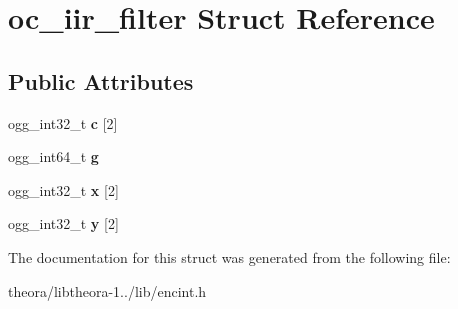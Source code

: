 \hypertarget{structoc__iir__filter}{\section{oc\+\_\+iir\+\_\+filter Struct Reference}
\label{structoc__iir__filter}
}
\subsection*{Public Attributes}
\begin{DoxyCompactItemize}
\item 
\hypertarget{structoc__iir__filter_a904a4532156c83b4cdf0576926f898a8}{ogg\+\_\+int32\+\_\+t {\bfseries c} \mbox{[}2\mbox{]}}\label{structoc__iir__filter_a904a4532156c83b4cdf0576926f898a8}

\item 
\hypertarget{structoc__iir__filter_adbd360cadc6c7bcb08a2b274be736770}{ogg\+\_\+int64\+\_\+t {\bfseries g}}\label{structoc__iir__filter_adbd360cadc6c7bcb08a2b274be736770}

\item 
\hypertarget{structoc__iir__filter_a18d61f660f95452382b01837226159a9}{ogg\+\_\+int32\+\_\+t {\bfseries x} \mbox{[}2\mbox{]}}\label{structoc__iir__filter_a18d61f660f95452382b01837226159a9}

\item 
\hypertarget{structoc__iir__filter_a5f162f8dac4d15546950fca9339ba544}{ogg\+\_\+int32\+\_\+t {\bfseries y} \mbox{[}2\mbox{]}}\label{structoc__iir__filter_a5f162f8dac4d15546950fca9339ba544}

\end{DoxyCompactItemize}


The documentation for this struct was generated from the following file\+:\begin{DoxyCompactItemize}
\item 
theora/libtheora-\/1../lib/encint.\+h\end{DoxyCompactItemize}
